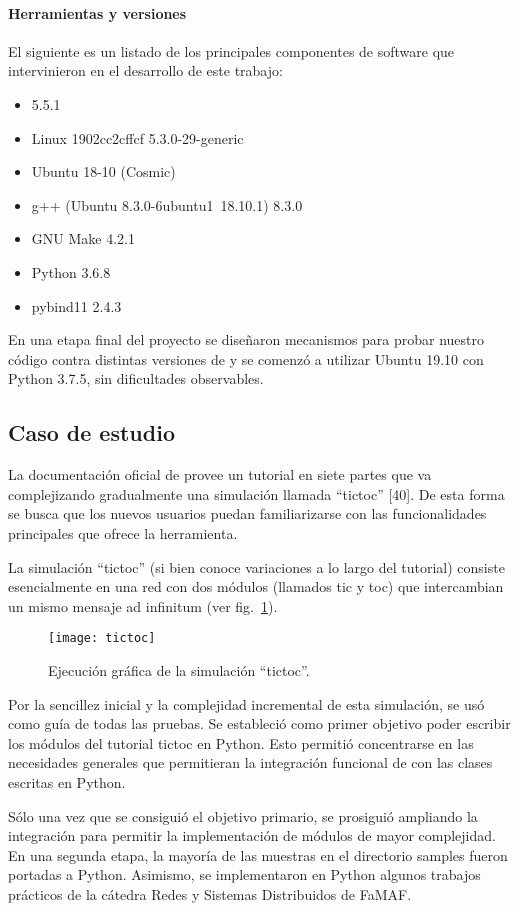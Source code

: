 \paragraph{Herramientas y versiones}

El siguiente es un listado de los principales componentes de software que
intervinieron en el desarrollo de este trabajo:

\begin{itemize}
    \item \omnetpp{} 5.5.1

    \item Linux 1902cc2cffcf 5.3.0-29-generic

    \item Ubuntu 18-10 (Cosmic)

    \item g++ (Ubuntu 8.3.0-6ubuntu1~18.10.1) 8.3.0

    \item GNU Make 4.2.1

    \item Python 3.6.8

    \item pybind11 2.4.3
\end{itemize}

En una etapa final del proyecto se diseñaron mecanismos para probar nuestro
código contra distintas versiones de \omnetpp{} y se comenzó a utilizar Ubuntu
19.10 con Python 3.7.5, sin dificultades observables.

\subsection{Caso de estudio}
La documentación oficial de \omnetpp{} provee un tutorial en siete partes que va
complejizando gradualmente una simulación llamada ``tictoc'' [40]. De esta forma
se busca que los nuevos usuarios puedan familiarizarse con las funcionalidades
principales que ofrece la herramienta.

La simulación ``tictoc'' (si bien conoce variaciones a lo largo del tutorial)
consiste esencialmente en una red con dos módulos (llamados tic y toc) que
intercambian un mismo mensaje ad infinitum (ver fig.~\ref{fig:tictoc}).

\begin{figure}[h]
\caption{Ejecución gráfica de la simulación ``tictoc''.}
\label{fig:tictoc}
\centering
\texttt{[image: tictoc]}
\end{figure}

Por la sencillez inicial y la complejidad incremental de esta simulación, se
usó como guía de todas las pruebas. Se estableció como primer objetivo poder
escribir los módulos del tutorial tictoc en Python. Esto permitió concentrarse
en las necesidades generales que permitieran la integración funcional de
\omnetpp{} con las clases escritas en Python.

Sólo una vez que se consiguió el objetivo primario, se prosiguió ampliando la
integración para permitir la implementación de módulos de mayor complejidad. En
una segunda etapa, la mayoría de las muestras en el directorio samples fueron
portadas a Python. Asimismo, se implementaron en Python algunos trabajos
prácticos de la cátedra Redes y Sistemas Distribuidos de FaMAF.
